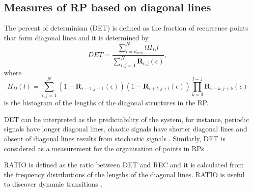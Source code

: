 \subsection{Measures of RP based on diagonal lines}
The percent of determinism (DET) is defined as the fraction of recurrence points
that form diagonal lines and it is determined by
\begin{equation}
	DET=\frac{\sum^{N}_{l=d_{min}} l H_D{l} }{\sum^{N}_{i,j=1} 
	\mathbf{R}_{i,j}(\epsilon) },
\end{equation}
where 
\begin{equation}
	H_D(l) = \sum^{N}_{i,j=1} (1- \mathbf{R}_{i-1,j-1}(\epsilon) ) 
		(1- \mathbf{R}_{i+l,j+l}(\epsilon) ) 
		\prod^{l-1}_{k=0}  \mathbf{R}_{i+k,j+k}(\epsilon)
\end{equation}
is the histogram of the lengths of the diagonal structures in the RP.

DET can be interpreted as the predictability of the system,
for instance, periodic signals have longer diagonal lines, 
chaotic signals have shorter diagonal lines and 
absent of diagonal lines results from stochastic 
signals \citep{marwan2007, marwan2015}. 
Similarly, DET is considered as a measurement for 
the organisation of points in RPs \citep{iwanski1998}. 

RATIO is defined as the ratio between DET and REC and it is calculated from 
the frequency distributions of the lengths of the diagonal lines.
RATIO is useful to discover dynamic transitions \citep{marwan2015}.
% 
%
%

